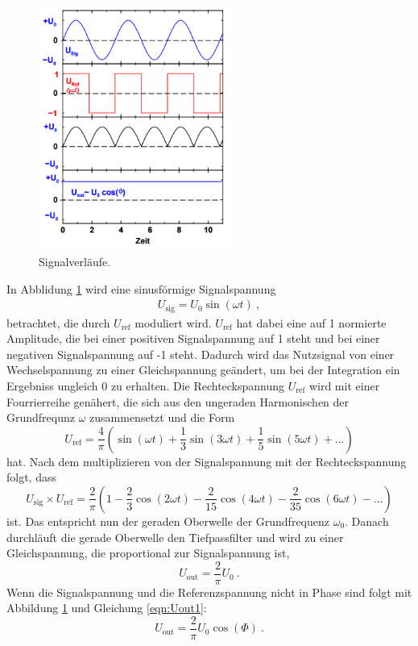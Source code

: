 \begin{figure}[H]
	\centering
	\includegraphics[height=8cm]{picture/SV.png}
	\caption{Signalverläufe. \cite[2]{sample}}
  \label{img:SV}
\end{figure}
In Abblidung \ref{img:SV} wird eine sinusförmige Signalspannung
\begin{align}
	U_\text{sig} = U_\text{0} \sin(\omega t) \ ,
\end{align}
betrachtet, die durch $U_\text{ref}$ moduliert wird. $U_\text{ref}$ hat dabei eine auf 1 normierte Amplitude, die bei einer positiven Signalspannung auf 1 steht und bei einer negativen Signalspannung auf -1 steht. Dadurch wird das Nutzsignal von einer Wechselspannung zu einer Gleichspannung geändert, um bei der Integration ein Ergebniss ungleich 0 zu erhalten.
Die Rechteckspannung $U_\text{ref}$ wird mit einer Fourrierreihe genähert, die sich aus den ungeraden Harmonischen der Grundfrequnz $\omega$ zusammensetzt und die Form
\begin{equation}
	U_\text{ref} = \frac{4}{\pi} \left( \sin(\omega t) + \frac{1}{3} \sin(3 \omega t) + \frac{1}{5} \sin(5 \omega t) + ... \right)
\end{equation}
hat. Nach dem multiplizieren von der Signalspannung mit der Rechteckspannung folgt, dass
\begin{equation}
	U_\text{sig} \times U_\text{ref} = \frac{2}{\pi} \left(1 - \frac{2}{3} \cos(2 \omega t) - \frac{2}{15} \cos(4 \omega t) - \frac{2}{35} \cos(6 \omega t) - ... \right)
	\label{eqn:foye}
\end{equation}
ist. Das entspricht nun der geraden Oberwelle der Grundfrequenz $\omega_\text{0}$. Danach durchläuft die gerade Oberwelle den Tiefpassfilter und wird zu einer Gleichspannung, die proportional zur Signalspannung ist,
\begin{equation}
	U_\text{out} = \frac{2}{\pi} U_\text{0} \ .
	\label{eqn:Uout1}
\end{equation}
Wenn die Signalspannung und die Referenzspannung nicht in Phase sind folgt mit Abbildung \ref{img:SV} und Gleichung \ref{eqn:Uout1}:
\begin{equation}
	U_\text{out} = \frac{2}{\pi} U_\text{0} \cos(\Phi) \ .
	\label{eqn:Uout2}
\end{equation}
\newpage

